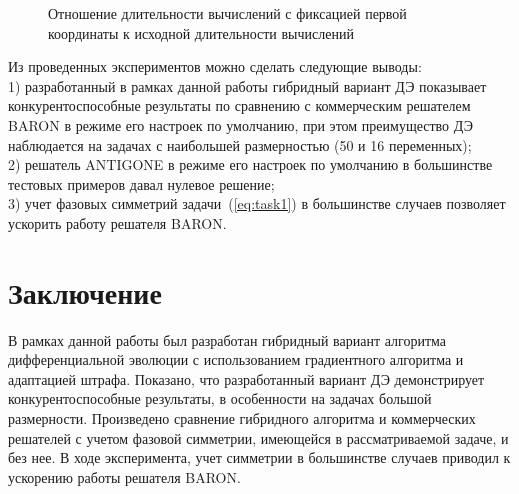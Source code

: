 \begin{figure}
\caption{Отношение длительности вычислений с фиксацией первой координаты к исходной длительности вычислений}
\label{ris:ring}
\end{figure}

Из проведенных экспериментов можно сделать следующие выводы:\\
1) разработанный в рамках данной работы гибридный вариант ДЭ показывает конкурентоспособные результаты по сравнению с коммерческим решателем BARON в режиме его настроек по умолчанию, при этом преимущество ДЭ наблюдается на задачах с наибольшей размерностью (50 и 16 переменных);\\
2) решатель ANTIGONE в режиме его настроек по умолчанию в большинстве тестовых примеров давал нулевое решение;\\
3) учет фазовых симметрий задачи~(\ref{eq:task1}) в большинстве случаев позволяет ускорить работу решателя BARON.\\

\section{Заключение}\label{sec:conclusion}

В рамках данной работы был разработан гибридный вариант алгоритма дифференциальной эволюции с использованием
градиентного алгоритма и адаптацией штрафа. Показано, что разработанный вариант ДЭ демонстрирует конкурентоспособные результаты, в
особенности на задачах большой размерности. Произведено сравнение гибридного алгоритма и коммерческих решателей с
учетом фазовой симметрии, имеющейся в рассматриваемой задаче, и без нее. В ходе эксперимента, учет симметрии в большинстве
случаев приводил к ускорению работы решателя BARON.
